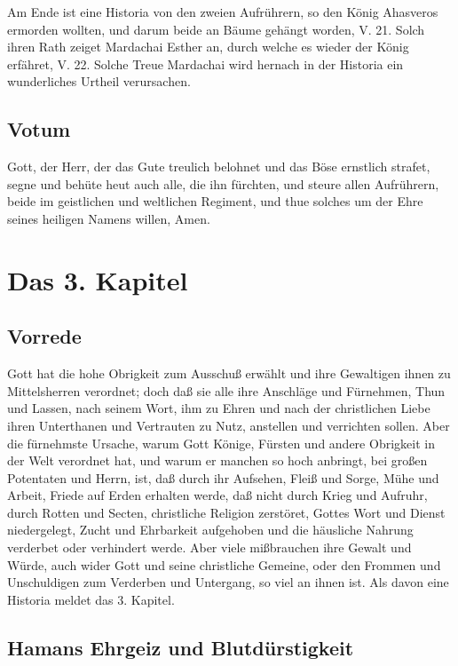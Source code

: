 Am Ende ist eine Historia von den zweien Aufrührern, so den König Ahasveros ermorden wollten, und darum beide an Bäume gehängt worden, V. 21. Solch ihren Rath zeiget Mardachai Esther an, durch welche es wieder der König erfähret, V. 22. Solche Treue Mardachai wird hernach in der Historia ein wunderliches Urtheil verursachen.

\section{Votum}

Gott, der Herr, der das Gute treulich belohnet und das Böse ernstlich strafet, segne und behüte heut auch alle, die ihn fürchten, und steure allen Aufrührern, beide im geistlichen und weltlichen Regiment, und thue solches um der Ehre seines heiligen Namens willen, Amen.

\chapter{Das 3. Kapitel}

\section{Vorrede}

Gott hat die hohe Obrigkeit zum Ausschuß erwählt und ihre Gewaltigen ihnen zu Mittelsherren verordnet; doch daß sie alle ihre Anschläge und Fürnehmen, Thun und Lassen, nach seinem Wort, ihm zu Ehren und nach der christlichen Liebe ihren Unterthanen und Vertrauten zu Nutz, anstellen und verrichten sollen. Aber die fürnehmste Ursache, warum Gott Könige, Fürsten und andere Obrigkeit in der Welt verordnet hat, und warum er manchen so hoch anbringt, bei großen Potentaten und Herrn, ist, daß durch ihr Aufsehen, Fleiß und Sorge, Mühe und Arbeit, Friede auf Erden erhalten werde, daß nicht durch Krieg und Aufruhr, durch Rotten und Secten, christliche Religion zerstöret, Gottes Wort und Dienst niedergelegt, Zucht und Ehrbarkeit aufgehoben und die häusliche Nahrung verderbet oder verhindert werde. Aber viele mißbrauchen ihre Gewalt und Würde, auch wider Gott und seine christliche Gemeine, oder den Frommen und Unschuldigen zum Verderben und Untergang, so viel an ihnen ist. Als davon eine Historia meldet das 3. Kapitel.

\section{Hamans Ehrgeiz und Blutdürstigkeit}


